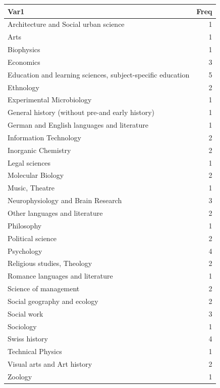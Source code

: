 \documentclass[]{tufte-book}
\begin{document}
\begin{longtable}[]{@{}lr@{}}
\toprule
Var1 & Freq \\
\midrule
\endhead
Architecture and Social urban science & 1 \\
Arts & 1 \\
Biophysics & 1 \\
Economics & 3 \\
Education and learning sciences, subject-specific education & 5 \\
Ethnology & 2 \\
Experimental Microbiology & 1 \\
General history (without pre-and early history) & 1 \\
German and English languages and literature & 1 \\
Information Technology & 2 \\
Inorganic Chemistry & 2 \\
Legal sciences & 1 \\
Molecular Biology & 2 \\
Music, Theatre & 1 \\
Neurophysiology and Brain Research & 3 \\
Other languages and literature & 2 \\
Philosophy & 1 \\
Political science & 2 \\
Psychology & 4 \\
Religious studies, Theology & 2 \\
Romance languages and literature & 1 \\
Science of management & 2 \\
Social geography and ecology & 2 \\
Social work & 3 \\
Sociology & 1 \\
Swiss history & 4 \\
Technical Physics & 1 \\
Visual arts and Art history & 2 \\
Zoology & 1 \\
\bottomrule
\end{longtable}
\end{document}
